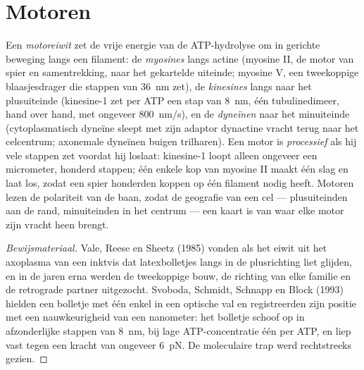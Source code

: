\section{Motoren}

\begin{definition}[Motoreiwitten]\label{def:b3:cytoskeleton-motility:motors}
Een \emph{motoreiwit} zet de vrije energie van de ATP-hydrolyse om in
gerichte beweging langs een filament: de \emph{myosines} langs actine
(myosine II, de motor van spier en samentrekking, naar het gekartelde
uiteinde; myosine V, een tweekoppige blaasjesdrager die stappen van
\qty{36}{nm} zet), de \emph{kinesines} langs  naar het
plusuiteinde (kinesine-1 zet per ATP een stap van \qty{8}{nm}, één
tubulinedimeer, hand over hand, met ongeveer \qty{800}{nm/s}), en de
\emph{dyneïnen} naar het minuiteinde (cytoplasmatisch dyneïne sleept
met zijn adaptor dynactine vracht terug naar het celcentrum;
axonemale dyneïnen buigen trilharen). Een motor is \emph{processief}
als hij vele stappen zet voordat hij loslaat: kinesine-1 loopt alleen
ongeveer een micrometer, honderd stappen; één enkele kop van myosine II
maakt één slag en laat los, zodat een spier honderden koppen op één
filament nodig heeft. Motoren lezen de polariteit van de baan, zodat de
geografie van een cel --- plusuiteinden aan de rand, minuiteinden in
het centrum --- een kaart is van waar elke motor zijn vracht heen
brengt.
\end{definition}

\begin{proof}[Bewijsmateriaal]
Vale, Reese en Sheetz (1985) vonden  als het eiwit uit het
axoplasma van een inktvis dat latexbolletjes langs  in de
plusrichting liet glijden, en in de jaren erna werden de tweekoppige
bouw, de richting van elke familie en de retrograde partner 
uitgezocht. Svoboda, Schmidt, Schnapp en Block (1993) hielden een
bolletje met één enkel  in een optische val en registreerden
zijn positie met een nauwkeurigheid van een nanometer: het bolletje
schoof op in afzonderlijke stappen van \qty{8}{nm}, bij lage
ATP-concentratie één per ATP, en liep vast tegen een kracht van
ongeveer \qty{6}{pN}. De moleculaire trap werd rechtstreeks gezien.
\end{proof}


